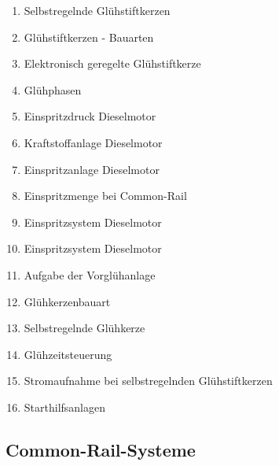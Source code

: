\begin{enumerate}
\item
  Selbstregelnde Glühstiftkerzen\\
\item
  Glühstiftkerzen - Bauarten\\
\item
  Elektronisch geregelte Glühstiftkerze\\
\item
  Glühphasen\\
\item
  Einspritzdruck Dieselmotor\\
\item
  Kraftstoffanlage Dieselmotor\\
\item
  Einspritzanlage Dieselmotor\\
\item
  Einspritzmenge bei Common-Rail\\
\item
  Einspritzsystem Dieselmotor\\
\item
  Einspritzsystem Dieselmotor\\
\item
  Aufgabe der Vorglühanlage\\
\item
  Glühkerzenbauart\\
\item
  Selbstregelnde Glühkerze\\
\item
  Glühzeitsteuerung\\
\item
  Stromaufnahme bei selbstregelnden Glühstiftkerzen\\
\item
  Starthilfsanlagen
\end{enumerate}

\subsection{Common-Rail-Systeme}\label{common-rail-systeme}

